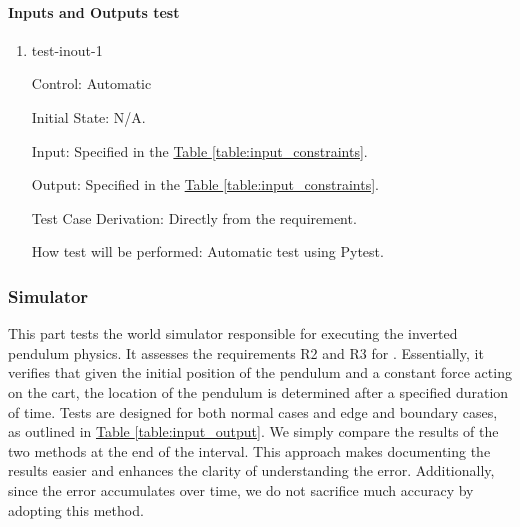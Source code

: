 \documentclass[12pt, titlepage]{article}
\begin{document}
\paragraph{Inputs and Outputs test}

\begin{enumerate}

  \item{test-inout-1\\}

        Control: Automatic

        Initial State: N/A.

        Input: Specified in the \hyperref[table:input_constraints]{Table \ref*{table:input_constraints}}.

        Output: Specified in the \hyperref[table:input_constraints]{Table \ref*{table:input_constraints}}.

        Test Case Derivation: Directly from the requirement.

        How test will be performed:
        Automatic test using Pytest.

\end{enumerate}

\subsubsection{Simulator} \label{func_test_simulator}

This part tests the world simulator responsible for executing
the inverted pendulum physics. It assesses the requirements
R2 and R3 for \progname{}. Essentially, it verifies that given the initial
position of the pendulum and a constant force acting on the cart,
the location of the pendulum is determined after a specified duration of time.
Tests are designed for both normal cases and edge and boundary cases, as outlined
in \hyperref[table:input_output]{Table \ref*{table:input_output}}.
We simply compare the results of the two methods at the end of the interval.
This approach makes documenting the results easier and enhances the clarity
of understanding the error. Additionally, since the error accumulates over time,
we do not sacrifice much accuracy by adopting this method.
\end{document}
